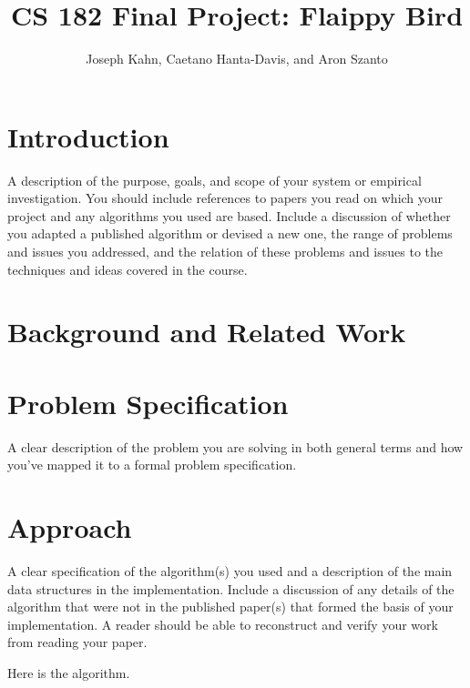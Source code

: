 \documentclass[11pt]{article}
\title{CS 182 Final Project: Flaippy Bird}
\author{Joseph Kahn, Caetano Hanta-Davis, and Aron Szanto}
\begin{document}
\maketitle{}


\section{Introduction}

A description of the purpose, goals, and scope of your system or
empirical investigation.  You should include references to papers you
read on which your project and any algorithms you used are
based. Include a discussion of whether you adapted a published
algorithm or devised a new one, the range of problems and issues you
addressed, and the relation of these problems and issues to the
techniques and ideas covered in the course.

\section{Background and Related Work}



\section{Problem Specification}

A clear description of the problem you are solving in both general terms
and how you've mapped it to a formal problem specification.


\section{Approach}

A clear specification of the algorithm(s) you used and a description
of the main data structures in the implementation. Include a
discussion of any details of the algorithm that were not in the
published paper(s) that formed the basis of your implementation. A
reader should be able to reconstruct and verify your work from reading
your paper.

\begin{algorithm}
  \begin{algorithmic}
    \EndProcedure{}
  \end{algorithmic}
  \caption{Here is the algorithm.}
\end{algorithm}
\end{document}
